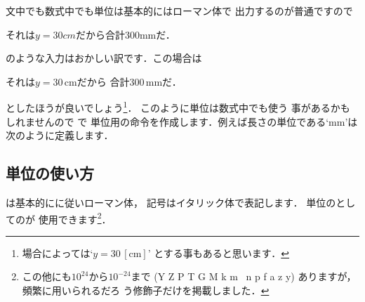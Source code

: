 文中でも数式中でも単位は基本的にはローマン体で
出力するのが普通ですので
\begin{inout}
それは$y=30cm$だから合計300mmだ．
\end{inout}
のような入力はおかしい訳です．この場合は
\begin{inout}
それは$y=30\,\mathrm{cm}$だから
合計300\,mmだ．
\end{inout}
としたほうが良いでしょう\footnote{場合によっては`$y=30\,[\mathrm{cm}]$'
とする事もあると思います．}．
このように単位は数式中でも使う
事があるかもしれませんので で
単位用の命令を作成します．例えば長さの単位である`mm'は
次のように定義します．

\subsection{単位の使い方}
%
は基本的にに従いローマン体，
記号はイタリック体で表記します．%
単位のとしてのが
使用できます\footnote{この他にも$10^{24}$から$10^{-24}$まで
 (Y Z P T G M k m \textmu\ n p f a z y) ありますが，頻繁に用いられるだろ
 う修飾子だけを掲載しました．}．

